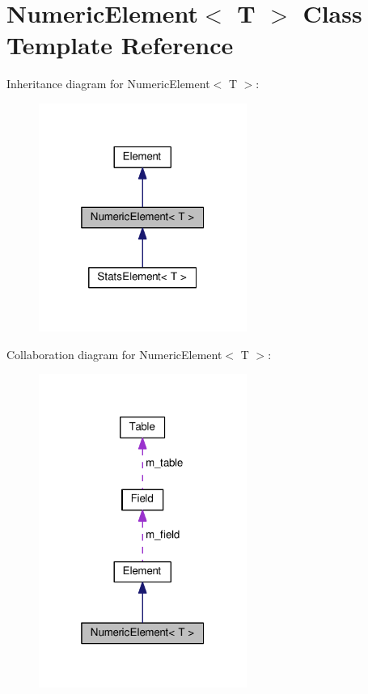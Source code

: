 \hypertarget{classNumericElement}{}\section{Numeric\+Element$<$ T $>$ Class Template Reference}
\label{classNumericElement}


Inheritance diagram for Numeric\+Element$<$ T $>$\+:\nopagebreak
\begin{figure}[H]
\begin{center}
\leavevmode
\includegraphics[width=193pt]{classNumericElement__inherit__graph}
\end{center}
\end{figure}


Collaboration diagram for Numeric\+Element$<$ T $>$\+:\nopagebreak
\begin{figure}[H]
\begin{center}
\leavevmode
\includegraphics[width=193pt]{classNumericElement__coll__graph}
\end{center}
\end{figure}
